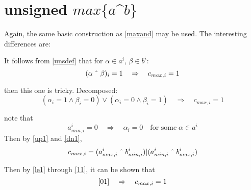 \documentclass{article}
\begin{document}
\begin{comment}
When $i_a \ne -1$, $i_a = max(i_0, bsr(xi01))$. Without using $max$,
this can be computed as follows:
\begin{lstlisting}
    uint32_t xa = xi0 | xi01;
    uint32_t ia = bsr(xa|1);
    return ia;
}
\end{lstlisting}

Altogether, the algorithm expressed in C is as follows:
\begin{lstlisting}
#include <stdint.h>
uint32_t maxand(uint32_t amin, uint32_t amax, uint32_t bmin, uint32_t bmax){
    uint32_t xa1 = ~amin&amax& bmin;
    uint32_t xa0 = ~amin&amax&~bmin;
    uint32_t xb1 =  amin&    &~bmin& bmax;
    uint32_t xb0 = ~amin&    &~bmin& bmax;
    xa1 |= ((1 << bsr(xa0|1))-1)&~amin&bmin;
    xb1 |= ((1 << bsr(xb0|1))-1)&~bmin&amin;
    if(xa1 > xb1) amin &= ~((1 << bsr(xa1|1))-1);
    else  bmin &= ~((1 << bsr(xb1|1))-1);
    return amin|bmin;
}
\end{lstlisting}
\end{comment}

\section{unsigned $max\{a$\^{}$b\}$}

Again, the same basic construction as \ref{maxand} may be used. 
The interesting differences are:

It follows from \eqref{unsdef} that for $\alpha \in a^i$, $\beta \in b^i$:
\begin{equation}
(\alpha \; \text{\^{}} \; \beta)_i = 1
\quad \Rightarrow \quad c_{max,i} = 1
\end{equation}

then this one is tricky. Decomposed:
\begin{equation*}
(\alpha_i = 1 \wedge \beta_i = 0) \vee (\alpha_i = 0 \wedge \beta_i = 1) 
\quad \Rightarrow \quad c_{max,i} = 1
\end{equation*}

note that
\begin{equation}\label{dn1}
a^i_{min, i} = 0 \quad \Rightarrow \quad \alpha_i = 0 \quad 
\text{for some} \; \alpha \in a^i
\end{equation}
Then by \eqref{up1} and \eqref{dn1},
\begin{equation}\label{maxxor}
c_{max,i} = (a^i_{max,i} \; \text{\^{}}\; b^i_{min,i}) 
\text{\textbar} (a^i_{min,i} \; \text{\^{}}\; b^i_{max,i}) 
\end{equation}

Then by \eqref{le1} through \eqref{11}, it can be shown that
\begin{equation*}
\eqref{01} \quad \Rightarrow \quad 
c_{max,i} = 1 
\end{equation*}
\end{document}

